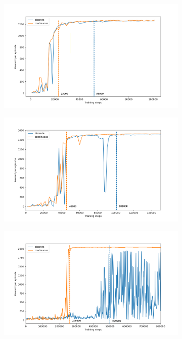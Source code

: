 \begin{figure}[h!]
	\centering
	\begin{subfigure}[t]{0.48\textwidth}
		\centering
		\includegraphics[width=\textwidth]{Figures/SP_discrete_vs_continuous_training_time.png}
		\label{fig: sp - training time}
		\caption{}
	\end{subfigure}
	\hfill
	\begin{subfigure}[t]{0.48\textwidth}
		\centering
		\includegraphics[width=\textwidth]{Figures/DP_discrete_vs_continuous_training_time.png}
		\label{fig: dp - training time}
		\caption{}
	\end{subfigure}
	\begin{subfigure}[t]{0.48\textwidth}
		\centering
		\includegraphics[width=\textwidth]{Figures/TP_discrete_vs_continuous_training_time.png}
		\label{fig: tp - training time}
		\caption{}
	\end{subfigure}
	

\end{figure}
